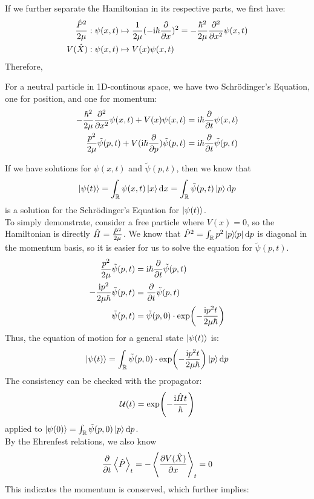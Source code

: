 If we further separate the Hamiltonian in its respective parts, we first have:
\begin{align*}
    \frac{\hat{P}^2}{2\mu}: \psi(x, t) &\mapsto \frac{1}{2\mu}(-\mathrm{i}\hbar\pdv{x})^2 = -\frac{\hbar^2}{2\mu}\pdv[2]{x} \psi(x, t) \\
    V(\hat{X}): \psi(x, t) &\mapsto V(x)\psi(x, t)
\end{align*}
Therefore, 
\begin{theorem}
    For a neutral particle in 1D-continous space, we have two Schr\"odinger's Equation, one for position, and one for momentum:
    \begin{align*}
        -\frac{\hbar^2}{2\mu}\pdv[2]{x} \psi(x, t) + V(x)\psi(x, t) &= \mathrm{i} \hbar \pdv{t}\psi(x, t) \\
        \frac{p^2}{2\mu}\tilde{\psi}(p, t) + V(\mathrm{i} \hbar \pdv{p})\tilde{\psi}(p, t) &= \mathrm{i} \hbar \pdv{t}\tilde{\psi}(p, t)
    \end{align*}
\end{theorem}
If we have solutions for $\psi(x, t)$ and $\tilde{\psi}(p, t)$, then we know that
$$\ket{\psi(t)} = \int_{\mathbb{R}} \psi(x, t) \ket{x} \dd x = \int_{\mathbb{R}} \tilde{\psi}(p,t) \ket{p} \dd p$$
is a solution for the Schr\"odinger's Equation for $\ket{\psi(t)}$. \\
To simply demonstrate, consider a free particle where $V(x) = 0$, so the Hamiltonian is directly $\hat{H} = \frac{\hat{P}^2}{2\mu}$. We know that $\opmtm^2 = \intR p^2 \dyad{p} \dd p$ is diagonal in the momentum basis, so it is easier for us to solve the equation for $\tilde{\psi}(p, t)$.
\begin{align*}
    \frac{p^2}{2\mu}\tilde{\psi}(p, t) &= \mathrm{i} \hbar \pdv{t}\tilde{\psi}(p, t) \\
    -\frac{\mathrm{i} p^2}{2\mu\hbar} \tilde{\psi}(p, t) &= \pdv{t} \tilde{\psi}(p, t) \\
    \tilde{\psi}(p, t) &= \tilde{\psi}(p, 0) \cdot \exp(-\frac{\mathrm{i} p^2t}{2\mu\hbar})
\end{align*}
Thus, the equation of motion for a general state $\ket{\psi(t)}$ is:
$$\ket{\psi(t)} = \int_{\mathbb{R}} \tilde{\psi}(p, 0) \cdot \exp(-\frac{\mathrm{i} p^2t}{2\mu\hbar}) \ket{p} \dd p$$
The consistency can be checked with the propagator:
$$\mathcal{U}(t) = \exp(-\frac{\mathrm{i} \hat{H} t}{\hbar})$$
applied to $\ket{\psi(0)} = \int_{\mathbb{R}} \tilde{\psi}(p, 0) \ket{p} \dd p$. \\
By the Ehrenfest relations, we also know
$$\pdv{t} \expval{\hat{P}}_t = - \expval{\pdv{V(\hat{X})}{x}}_t = 0$$
This indicates the momentum is conserved, which further implies:

